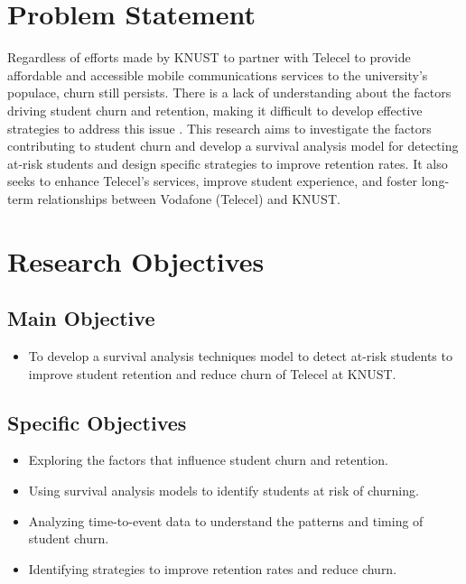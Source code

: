 \documentclass[12pt]{report}
\begin{document}
\section{Problem Statement}

Regardless of efforts made by KNUST to partner with Telecel to provide affordable and accessible mobile communications services to the university’s populace, churn still persists. There is a lack of understanding about the factors driving student churn and retention, making it difficult to develop effective strategies to address this issue \cite{kapur2018}. This research aims to investigate the factors contributing to student churn and develop a survival analysis model for detecting at-risk students and design specific strategies to improve retention rates. It also seeks to enhance Telecel’s services, improve student experience, and foster long-term relationships between Vodafone (Telecel) and KNUST.

\section{Research Objectives}

\subsection{Main Objective}
\begin{itemize}
    \item To develop a survival analysis techniques model to detect at-risk students to improve student retention and reduce churn of Telecel at KNUST.
\end{itemize}

\subsection{Specific Objectives}
\begin{itemize}
    \item Exploring the factors that influence student churn and retention.
    \item Using survival analysis models to identify students at risk of churning.
    \item Analyzing time-to-event data to understand the patterns and timing of student churn.
    \item Identifying strategies to improve retention rates and reduce churn.
\end{itemize}
\end{document}
